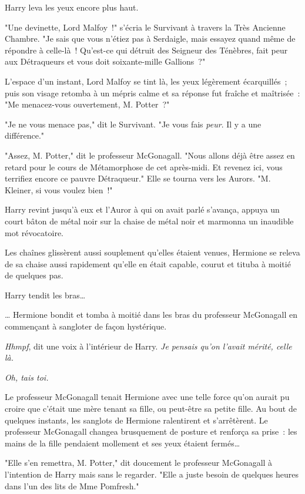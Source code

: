 Harry leva les yeux encore plus haut.

"Une devinette, Lord Malfoy~!" s'écria le Survivant à travers la Très Ancienne Chambre. "Je sais que vous n'étiez pas à Serdaigle, mais essayez quand même de répondre à celle-là~! Qu'est-ce qui détruit des Seigneur des Ténèbres, fait peur aux Détraqueurs et vous doit soixante-mille Gallions~?"

L'espace d'un instant, Lord Malfoy se tint là, les yeux légèrement écarquillés~; puis son visage retomba à un mépris calme et sa réponse fut fraîche et maîtrisée~: "Me menacez-vous ouvertement, M. Potter~?"

"Je ne vous menace pas," dit le Survivant. "Je vous fais \emph{peur}. Il y a une différence."

"Assez, M. Potter," dit le professeur McGonagall. "Nous allons déjà être assez en retard pour le cours de Métamorphose de cet après-midi. Et revenez ici, vous terrifiez encore ce pauvre Détraqueur." Elle se tourna vers les Aurors. "M. Kleiner, si vous voulez bien~!"

Harry revint jusqu'à eux et l'Auror à qui on avait parlé s'avança, appuya un court bâton de métal noir sur la chaise de métal noir et marmonna un inaudible mot révocatoire.

Les chaînes glissèrent aussi souplement qu'elles étaient venues, Hermione se releva de sa chaise aussi rapidement qu'elle en était capable, courut et tituba à moitié de quelques pas.

Harry tendit les bras…

… Hermione bondit et tomba à moitié dans les bras du professeur McGonagall en commençant à sangloter de façon hystérique.

\emph{Hhmpf}, dit une voix à l'intérieur de Harry. \emph{Je pensais qu'on l'avait mérité, celle là.}

\emph{Oh, tais toi.}

Le professeur McGonagall tenait Hermione avec une telle force qu'on aurait pu croire que c'était une mère tenant sa fille, ou peut-être sa petite fille. Au bout de quelques instants, les sanglots de Hermione ralentirent et s'arrêtèrent. Le professeur McGonagall changea brusquement de posture et renforça sa prise~: les mains de la fille pendaient mollement et ses yeux étaient fermés…

"Elle s'en remettra, M. Potter," dit doucement le professeur McGonagall à l'intention de Harry mais sans le regarder. "Elle a juste besoin de quelques heures dans l'un des lits de Mme Pomfresh."

